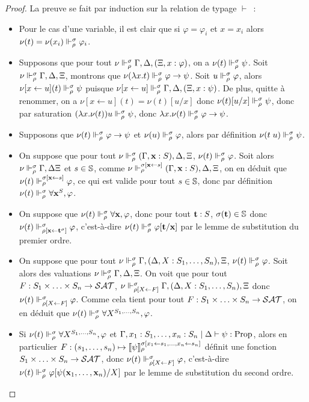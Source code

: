 \documentclass{article}
\begin{document}
\begin{proof}
  La preuve se fait par induction sur la relation de typage $\vdash$~:
  \begin{itemize}
  \item Pour le cas d'une variable, il est clair que si $\varphi = \varphi_i$ et $x = x_i$ alors $\nu(t) = \nu(x_i)\Vdash_\rho^\sigma \varphi_i$.
  \item Supposons que pour tout $\nu \Vdash_\rho^\sigma \Gamma,\Delta,(\Xi, x : \varphi)$, on a $\nu(t) \Vdash_\rho^\sigma \psi$. Soit $\nu \Vdash_\rho^\sigma \Gamma,\Delta,\Xi$, montrons que $\nu(\lambda x.t)\Vdash_\rho^\sigma \varphi \to \psi$. Soit $u \Vdash_\rho^\sigma \varphi$, alors $\nu[x \leftarrow u](t)\Vdash_\rho^\sigma \psi$ puisque $\nu[x\leftarrow u]\Vdash_\rho^\sigma \Gamma,\Delta,(\Xi, x : \psi)$. De plus, quitte à renommer, on a $\nu[x\leftarrow u](t) = \nu(t)[u/x]$ donc $\nu(t)[u/x]\Vdash_\rho^\sigma \psi$, donc par saturation $(\lambda x.\nu(t)) u \Vdash_\rho^\sigma \psi$, donc $\lambda x.\nu(t)\Vdash_\rho^\sigma \varphi\to\psi$.
  \item Supposons que $\nu(t)\Vdash_\rho^\sigma \varphi \to \psi$ et $\nu(u)\Vdash_\rho^\sigma \varphi$, alors par définition $\nu(t\;u)\Vdash_\rho^\sigma \psi$.
  \item On suppose que pour tout $\nu\Vdash_\rho^\sigma (\Gamma, \mathbf{x} : S),\Delta,\Xi$, $\nu(t)\Vdash_\rho^\sigma \varphi$. Soit alors $\nu\Vdash_\rho^\sigma \Gamma,\Delta\Xi$ et $s \in \mathbb{S}$, comme $\nu\Vdash_\rho^{\sigma[\mathbf{x}\leftarrow s]} (\Gamma,\mathbf{x} : S), \Delta,\Xi$, on en déduit que $\nu(t)\Vdash_\rho^{\sigma[\mathbf{x}\leftarrow s]} \varphi$, ce qui est valide pour tout $s\in \mathbb{S}$, donc par définition $\nu(t)\Vdash_\rho^\sigma \forall \mathbf{x}^S, \varphi$.
  \item On suppose que $\nu(t)\Vdash_\rho^\sigma \forall \mathbf{x}, \varphi$, donc pour tout $\mathbf{t} : S$, $\sigma(\mathbf{t}) \in \mathbb S$ donc $\nu(t)\Vdash_{\rho[\mathbf{x}\leftarrow \mathbf{t}^\sigma]}^\sigma \varphi$, c'est-à-dire $\nu(t)\Vdash_\rho^\sigma \varphi[\mathbf{t}/\mathbf{x}]$ par le lemme de substitution du premier ordre.
  \item On suppose que pour tout $\nu\Vdash_\rho^\sigma \Gamma, (\Delta, X : S_1,\ldots,S_n), \Xi$, $\nu(t) \Vdash_\rho^\sigma \varphi$. Soit alors des valuations $\nu\Vdash_\rho^\sigma\Gamma, \Delta,\Xi$. On voit que pour tout $F : S_1\times\ldots\times S_n \to \mathcal {SAT}$, $\nu\Vdash_{\rho[X\leftarrow F]}^\sigma \Gamma, (\Delta, X : S_1,\ldots,S_n),\Xi$ donc $\nu(t)\Vdash_{\rho[X\leftarrow F]}^\sigma \varphi$. Comme cela tient pour tout $F : S_1\times\ldots\times S_n \to \mathcal {SAT}$, on en déduit que $\nu(t)\Vdash_\rho^\sigma \forall X^{S_1,\ldots,S_n}, \varphi$.
  \item Si $\nu(t)\Vdash_\rho^\sigma \forall X^{S_1,\ldots,S_n}, \varphi$ et $\Gamma,x_1 : S_1,\ldots,x_n : S_n\mid\Delta\vdash \psi : \mathrm{Prop}$, alors en particulier $F : (s_1,\ldots,s_n) \mapsto \llbracket \psi \rrbracket_\rho^{\sigma[x_1\leftarrow s_1,\ldots, x_n \leftarrow s_n]}$ définit une fonction $S_1\times\ldots\times S_n \to\mathcal {SAT}$, donc $\nu(t)\Vdash_{\rho[X\leftarrow F]}^\sigma \varphi$, c'est-à-dire $\nu(t)\Vdash_\rho^\sigma \varphi[\psi(\mathbf{x}_1,\ldots,\mathbf{x}_n)/X]$ par le lemme de substitution du second ordre.
  \end{itemize}


\end{proof}
\end{document}
